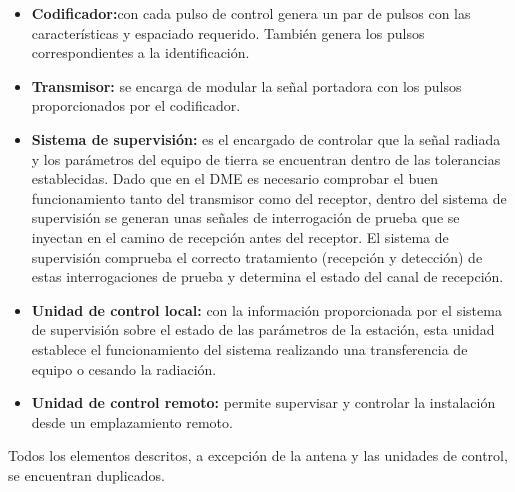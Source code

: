 \begin{itemize}
\item \textbf{Codificador:}con cada pulso de control genera un par de pulsos con
  las caracter\'isticas y espaciado requerido. Tambi\'en genera los pulsos
  correspondientes a la identificaci\'on.
\item \textbf{Transmisor:} se encarga de
  modular la se\~nal portadora con los pulsos proporcionados por el
  codificador.
\item \textbf{Sistema de supervisi\'on:} es el encargado de controlar
  que la se\~nal radiada y los par\'ametros del equipo de tierra se
  encuentran dentro de las tolerancias establecidas. Dado que en el
  DME es necesario comprobar el buen funcionamiento tanto del
  transmisor como del receptor, dentro del sistema de supervisi\'on se
  generan unas se\~nales de interrogaci\'on de prueba que se inyectan en
  el camino de recepci\'on antes del receptor. El sistema de supervisi\'on
  comprueba el correcto tratamiento (recepci\'on y detecci\'on) de estas
  interrogaciones de prueba y determina el estado del canal de
  recepci\'on.
\item \textbf{Unidad de control local:} con la informaci\'on
  proporcionada por el sistema de supervisi\'on sobre el estado de las
  par\'ametros de la estaci\'on, esta unidad establece el funcionamiento
  del sistema realizando una transferencia de equipo o cesando la
  radiaci\'on.
\item \textbf{Unidad de control remoto:} permite supervisar y controlar
  la instalaci\'on desde un emplazamiento remoto.
\end{itemize}

 Todos los elementos descritos, a excepci\'on de la antena y las unidades de control, se encuentran duplicados.


